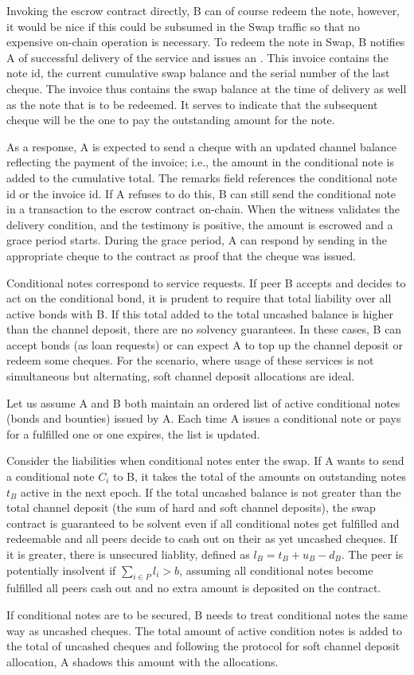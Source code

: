 Invoking the escrow contract directly, B can of course redeem the note, however, it would be nice if this could be subsumed in the Swap traffic so that no expensive on-chain operation is necessary. 
To redeem the note in Swap, B notifies A of successful delivery of the service and issues an . This invoice contains the note id, the current cumulative swap balance and the serial number of the last cheque. The invoice thus contains the swap balance at the time of delivery as well as the note that is to be redeemed. It serves to indicate that the subsequent cheque will be the one to pay the outstanding amount for the note.

As a response, A is expected to send a cheque with an updated channel balance reflecting the payment of the invoice; i.e., the amount in the conditional note is added to the cumulative total. The remarks field references the conditional note id or the invoice id. If A refuses to do this, B can still send the conditional note in a transaction to the escrow contract on-chain. When the witness validates the delivery condition, and the testimony is positive, the amount is escrowed and a grace period starts. During the grace period, A can respond by sending in the appropriate cheque to the contract as proof that the cheque was issued.

Conditional notes correspond to service requests. If peer B accepts and decides to act on the conditional bond, it is prudent to require that total liability over all active bonds with B. If this total added to the total uncashed balance is higher than the channel deposit, there are no solvency guarantees. In these cases, B can accept bonds (as loan requests) or can expect A to top up the channel deposit or redeem some cheques. For the scenario, where usage of these services is not simultaneous but alternating, soft channel deposit allocations 
are ideal.

Let us assume A and B both maintain an ordered list of active conditional notes (bonds and bounties) issued by A.
Each time A issues a conditional note or pays for a fulfilled one or one expires, the list is updated.

Consider the liabilities when conditional notes enter the swap. 
If A wants to send a conditional note $C_i$ to B, it takes the total of the amounts on outstanding  notes $t_B$ active in the next epoch. 
If the total uncashed balance is not greater than the total channel deposit (the sum of hard and soft channel deposits), the swap contract is guaranteed to be solvent even if all conditional notes get fulfilled and redeemable and all peers decide to cash out on their as yet uncashed cheques. If it is greater, there is unsecured liablity, defined as $l_B = t_B + u_B - d_B$. The peer is potentially insolvent if $\sum_{i\in P}l_i > b$, assuming all conditional notes become fulfilled all peers cash out and no extra amount is deposited on the contract. 

If conditional notes are to be secured, B needs to treat conditional notes the same way as uncashed cheques.
The total amount of active condition notes is added to the total of uncashed cheques and following the protocol for soft channel deposit allocation, A shadows this amount with the allocations.
                            